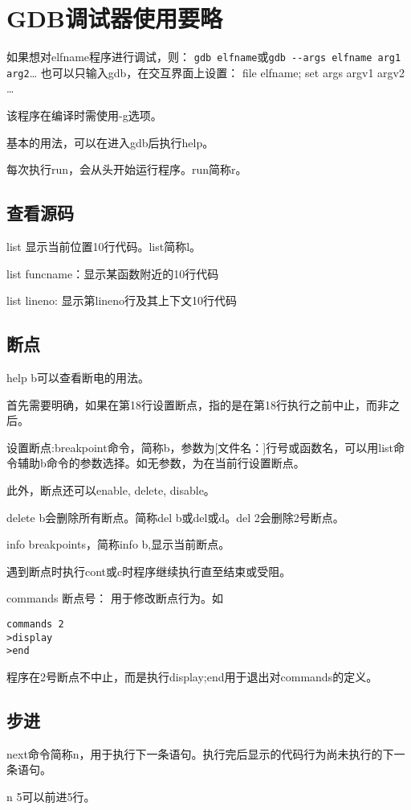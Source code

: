 \section{GDB调试器使用要略}


如果想对elfname程序进行调试，则：
\verb+gdb elfname+或\verb+gdb --args elfname arg1 arg2+\ldots
也可以只输入gdb，在交互界面上设置：
file elfname;
set args argv1 argv2 \ldots 

该程序在编译时需使用-g选项。

基本的用法，可以在进入gdb后执行help。

每次执行run，会从头开始运行程序。run简称r。

\subsection{查看源码}
list 显示当前位置10行代码。list简称l。

list funcname：显示某函数附近的10行代码

list lineno: 显示第lineno行及其上下文10行代码


\subsection{断点}
help b可以查看断电的用法。

首先需要明确，如果在第18行设置断点，指的是在第18行执行之前中止，而非之后。

设置断点:breakpoint命令，简称b，参数为[文件名：]行号或函数名，可以用list命令辅助b命令的参数选择。如无参数，为在当前行设置断点。

此外，断点还可以enable, delete, disable。

delete b会删除所有断点。简称del b或del或d。del 2会删除2号断点。

info breakpoints，简称info b,显示当前断点。

遇到断点时执行cont或c时程序继续执行直至结束或受阻。

commands 断点号：
用于修改断点行为。如 
\begin{verbatim}
commands 2
>display
>end
\end{verbatim}
程序在2号断点不中止，而是执行display;end用于退出对commands的定义。

\subsection{步进}
next命令简称n，用于执行下一条语句。执行完后显示的代码行为尚未执行的下一条语句。

n 5可以前进5行。


